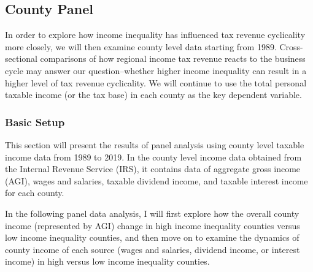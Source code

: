 \documentclass{article}
\begin{document}
\subsection{County Panel}
In order to explore how income inequality has influenced tax revenue cyclicality more closely, we will then examine county level data starting from 1989. Cross-sectional comparisons of how regional income tax revenue reacts to the business cycle may answer our question--whether higher income inequality can result in a higher level of tax revenue cyclicality. We will continue to use the total personal taxable income (or the tax base) in each county as the key dependent variable. 

\subsubsection{Basic Setup}

This section will present the results of panel analysis using county level taxable income data from 1989 to 2019. In the county level income data obtained from the Internal Revenue Service (IRS), it contains data of aggregate gross income (AGI), wages and salaries, taxable dividend income, and taxable interest income for each county. 

In the following panel data analysis, I will first explore how the overall county income (represented by AGI) change in high income inequality counties versus low income inequality counties, and then move on to examine the dynamics of county income of each source (wages and salaries, dividend income, or interest income) in high versus low income inequality counties. 
\end{document}
